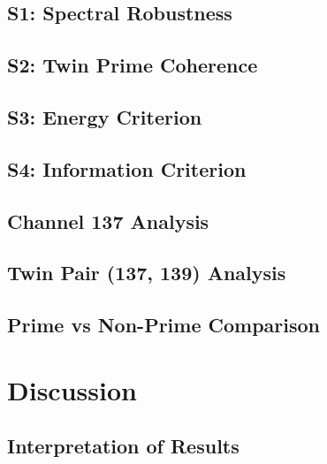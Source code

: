 \documentclass[11pt,a4paper]{article}
\begin{document}
\subsection{S1: Spectral Robustness}


\subsection{S2: Twin Prime Coherence}


\subsection{S3: Energy Criterion}


\subsection{S4: Information Criterion}


\subsection{Channel 137 Analysis}


\subsection{Twin Pair (137, 139) Analysis}


\subsection{Prime vs Non-Prime Comparison}


\section{Discussion}

\subsection{Interpretation of Results}
\end{document}
